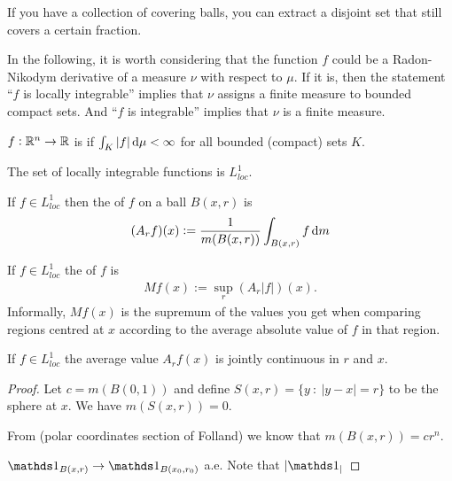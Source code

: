 If you have a collection of covering balls, you can extract a disjoint set that still covers a certain
fraction.

\begin{remark*}
  In the following, it is worth considering that the function $f$ could be a Radon-Nikodym derivative of a
  measure $\nu$ with respect to $\mu$. If it is, then the statement ``$f$ is locally integrable​'' implies
  that $\nu$ assigns a finite measure to bounded compact sets. And ``$f$ is integrable​'' implies that $\nu$ is a
  finite measure.
\end{remark*}

\begin{definition*}
  $f: \mathbb{R}^n \to \mathbb{R}$ is  if $\int_K |f| \dmu < \infty$ for all bounded (compact) sets $K$.

  The set of locally integrable functions is $L^1_{loc}$.
\end{definition*}

\begin{definition}
  If $f \in L^1_{loc}$ then the  of $f$ on a ball $B(x, r)$ is
  \begin{align*}
    (A_r f)(x) := \frac{1}{m(B(x, r))} \int_{B(x, r)} f \dm
\end{align*}
\end{definition}


\begin{definition}
  If $f \in L^1_{loc}$ the  of $f$ is
  \begin{align*}
    M f(x) := \sup_r (A_r |f|)(x).
  \end{align*}
  Informally, $M f(x)$ is the supremum of the values you get when comparing regions centred at $x$ according to
  the average absolute value of $f$ in that region.
\end{definition}

\begin{lemma}
  If $f \in L^1_{loc}$ the average value $A_r f(x)$ is jointly continuous in $r$ and $x$.
\end{lemma}

\begin{proof}
  Let $c = m(B(0, 1))$ and define $S(x, r) = \{y ~:~ |y - x| = r\}$ to be the sphere at $x$. We have $m(S(x, r)) = 0$.

  From (polar coordinates section of Folland) we know that $m(B(x, r)) = cr^n$.

  $\ind_{B(x, r)} \to \ind_{B(x_0, r_0)}$ a.e. Note that $|\ind_|$
\end{proof}

